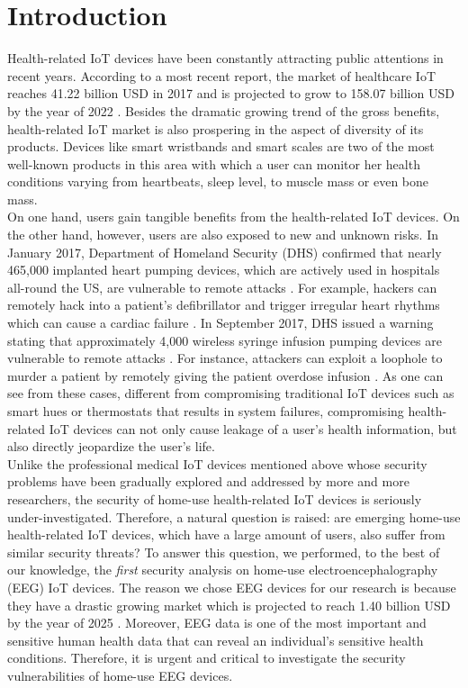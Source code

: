\section{Introduction}
\label{sec:introduction}
Health-related IoT devices have been constantly attracting public attentions in recent years. According to a most recent report, the market of healthcare IoT reaches 41.22 billion USD in 2017 and is projected to grow to 158.07 billion USD by the year of 2022 \cite{healthiotmarket}. Besides the dramatic growing trend of the gross benefits, health-related IoT market is also prospering in the aspect of diversity of its products. Devices like smart wristbands and smart scales are two of the most well-known products in this area with which a user can monitor her health conditions varying from heartbeats, sleep level, to muscle mass or even bone mass.\\
\indent On one hand, users gain tangible benefits from the health-related IoT devices. On the other hand, however, users are also exposed to new and unknown risks. In January 2017, Department of Homeland Security (DHS) confirmed that nearly 465,000 implanted heart pumping devices, which are actively used in hospitals all-round the US, are vulnerable to remote attacks \cite{heartpump}. For example, hackers can remotely hack into a patient's defibrillator and trigger irregular heart rhythms which can cause a cardiac failure \cite{heartpump}. In September 2017, DHS issued a warning stating that approximately 4,000 wireless syringe infusion pumping devices are vulnerable to remote attacks \cite{infusionhack}. For instance, attackers can exploit a loophole to murder a patient by remotely giving the patient overdose infusion \cite{infusionhack}. As one can see from these cases, different from compromising traditional IoT devices such as smart hues or thermostats that results in system failures, compromising health-related IoT devices can not only cause leakage of a user's health information, but also directly jeopardize the user's life.\\
\indent Unlike the professional medical IoT devices mentioned above whose security problems have been gradually explored and addressed by more and more researchers, the security of home-use health-related IoT devices is seriously under-investigated. Therefore, a natural question is raised: are emerging home-use health-related IoT devices, which have a large amount of users, also suffer from similar security threats? To answer this question, we performed, to the best of our knowledge, the \emph{first} security analysis on home-use electroencephalography (EEG) IoT devices. The reason we chose EEG devices for our research is because they have a drastic growing market which is projected to reach 1.40 billion USD by the year of 2025 \cite{2025eegdevicemarket}. Moreover, EEG data is one of the most important and sensitive human health data that can reveal an individual's sensitive health conditions. Therefore, it is urgent and critical to investigate the security vulnerabilities of home-use EEG devices.\\
